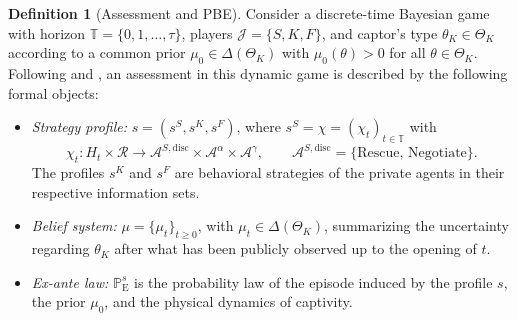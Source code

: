 \documentclass[review,authoryear,12pt]{elsarticle}
\providecommand{\textcite}{\citet}
\theoremstyle{plain}
\theoremstyle{definition}
\newtheorem{definition}[theorem]{Definition}
\newcommand{\ProbE}{\mathbb{P}_{\mathrm{E}}}
\newcommand{\ThetaK}{\Theta_K}
\newcommand{\1}{\mathbf{1}}
\begin{document}
\begin{definition}[Assessment and PBE]
\label{def:pbe-mechanism}
Consider a discrete-time Bayesian game with horizon $\mathbb{T}=\{0,1,\ldots,\tau\}$, players $\mathcal{J}=\{S,K,F\}$, and captor's type $\theta_K\in\ThetaK$ according to a common prior $\mu_0\in\Delta(\ThetaK)$ with $\mu_0(\theta)>0$ for all $\theta\in\ThetaK$. Following \textcite{FudenbergTirole1991} and \textcite{KrepsWilson1982}, an assessment in this dynamic game is described by the following formal objects:

\begin{itemize}
  \item \emph{Strategy profile:} $s=(s^S,s^K,s^F)$, where $s^S=\chi=(\chi_t)_{t\in\mathbb{T}}$ with
  \[
    \chi_t \colon H_t\times\mathcal{R}
    \longrightarrow \mathcal{A}^{S,\mathrm{disc}}\times\mathcal{A}^{\alpha}\times\mathcal{A}^{\gamma},
    \qquad
    \mathcal{A}^{S,\mathrm{disc}}=\{\text{Rescue},\,\text{Negotiate}\}.
  \]
  The profiles $s^K$ and $s^F$ are behavioral strategies of the private agents in their respective information sets.
  \item \emph{Belief system:} $\mu=\{\mu_t\}_{t\ge 0}$, with $\mu_t\in\Delta(\ThetaK)$, summarizing the uncertainty regarding $\theta_K$ after what has been publicly observed up to the opening of $t$.
  \item \emph{Ex-ante law:} $\ProbE^s$ is the probability law of the episode induced by the profile $s$, the prior $\mu_0$, and the physical dynamics of captivity.
\end{itemize}


\end{definition}
\end{document}
